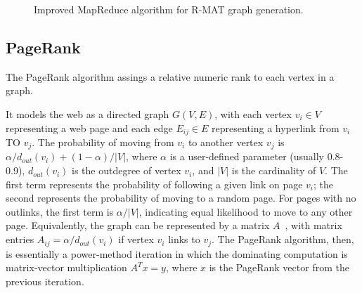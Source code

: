 \begin{figure}[htb]
 \begin{center}\end{center}

 \caption{Improved MapReduce algorithm for R-MAT graph generation.}

 \label{fig:rmat2}
\end{figure}

\subsection{PageRank}

The PageRank algorithm assings a relative numeric rank to each
vertex in a graph.

It models the web as a directed graph $G(V,E)$, with each vertex $v_i
\in V$ representing a web page and each edge $E_{ij} \in E$
representing a hyperlink from $v_i$ TO $v_j$.  The probability of
moving from $v_i$ to another vertex $v_j$ is $\alpha/d_{out}(v_i) +
(1-\alpha)/|V|$, where $\alpha$ is a user-defined parameter (usually
0.8-0.9), $d_{out}(v_i)$ is the outdegree of vertex $v_i$, and $|V|$ is
the cardinality of $V$.  The first term represents the probability of
following a given link on page $v_i$; the second represents the
probability of moving to a random page.  For pages with no outlinks,
the first term is $\alpha/|V|$, indicating equal likelihood to move to
any other page.  Equivalently, the graph can be represented by a
matrix $A$~\cite{LangvilleMeyer05a}, with matrix entries $A_{ij} =
\alpha/d_{out}(v_i)$ if vertex $v_i$ links to $v_j$.  The PageRank
algorithm, then, is essentially a power-method iteration in which the
dominating computation is matrix-vector multiplication $A^T x=y$,
where $x$ is the PageRank vector from the previous iteration.

